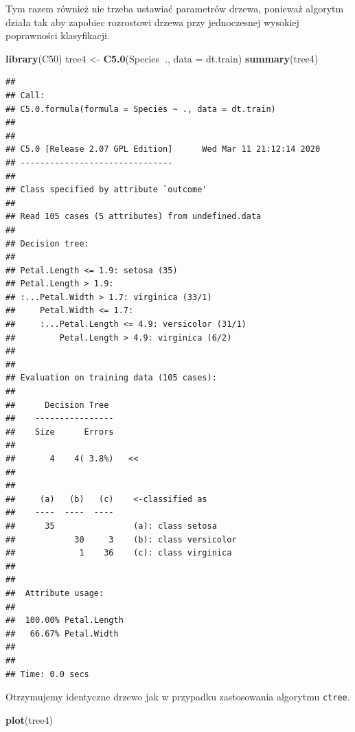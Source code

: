 \documentclass[
]{book}
\newenvironment{Shaded}{\begin{snugshade}}{\end{snugshade}}
\newcommand{\DataTypeTok}[1]{\textcolor[rgb]{0.13,0.29,0.53}{#1}}
\newcommand{\KeywordTok}[1]{\textcolor[rgb]{0.13,0.29,0.53}{\textbf{#1}}}
\newcommand{\NormalTok}[1]{#1}
\newcommand{\OperatorTok}[1]{\textcolor[rgb]{0.81,0.36,0.00}{\textbf{#1}}}
\newcommand{\StringTok}[1]{\textcolor[rgb]{0.31,0.60,0.02}{#1}}
\theoremstyle{plain}
\theoremstyle{definition}
\theoremstyle{definition}
\theoremstyle{definition}
\theoremstyle{definition}
\theoremstyle{remark}
\begin{document}
Tym razem również nie trzeba ustawiać parametrów drzewa, ponieważ algorytm działa tak aby zapobiec rozrostowi drzewa przy jednoczesnej wysokiej poprawności klasyfikacji.

\begin{Shaded}
\begin{Highlighting}[]
\KeywordTok{library}\NormalTok{(C50)}
\NormalTok{tree4 <-}\StringTok{ }\KeywordTok{C5.0}\NormalTok{(Species}\OperatorTok{~}\NormalTok{., }\DataTypeTok{data =}\NormalTok{ dt.train)}
\KeywordTok{summary}\NormalTok{(tree4)}
\end{Highlighting}
\end{Shaded}

\begin{verbatim}
## 
## Call:
## C5.0.formula(formula = Species ~ ., data = dt.train)
## 
## 
## C5.0 [Release 2.07 GPL Edition]      Wed Mar 11 21:12:14 2020
## -------------------------------
## 
## Class specified by attribute `outcome'
## 
## Read 105 cases (5 attributes) from undefined.data
## 
## Decision tree:
## 
## Petal.Length <= 1.9: setosa (35)
## Petal.Length > 1.9:
## :...Petal.Width > 1.7: virginica (33/1)
##     Petal.Width <= 1.7:
##     :...Petal.Length <= 4.9: versicolor (31/1)
##         Petal.Length > 4.9: virginica (6/2)
## 
## 
## Evaluation on training data (105 cases):
## 
##      Decision Tree   
##    ----------------  
##    Size      Errors  
## 
##       4    4( 3.8%)   <<
## 
## 
##     (a)   (b)   (c)    <-classified as
##    ----  ----  ----
##      35                (a): class setosa
##            30     3    (b): class versicolor
##             1    36    (c): class virginica
## 
## 
##  Attribute usage:
## 
##  100.00% Petal.Length
##   66.67% Petal.Width
## 
## 
## Time: 0.0 secs
\end{verbatim}

Otrzymujemy identyczne drzewo jak w przypadku zastosowania algorytmu \texttt{ctree}.

\begin{Shaded}
\begin{Highlighting}[]
\KeywordTok{plot}\NormalTok{(tree4)}
\end{Highlighting}
\end{Shaded}
\end{document}
